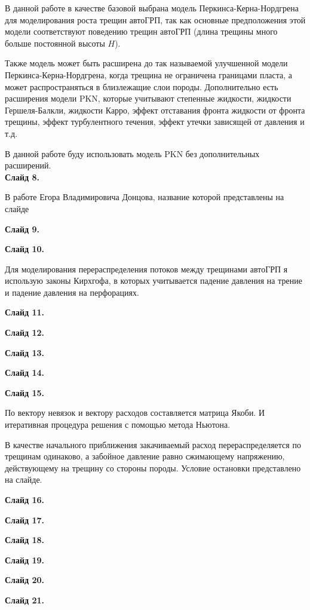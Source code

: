 \documentclass[a4paper, 12pt]{article}
\begin{document}
В данной работе в качестве базовой выбрана модель Перкинса-Керна-Нордгрена для моделирования роста трещин автоГРП, так как основные предположения этой модели соответствуют поведению трещин автоГРП (длина трещины много больше постоянной высоты $H$).


Также модель может быть расширена до так называемой улучшенной модели Перкинса-Керна-Нордгрена, когда трещина не ограничена границами пласта, а может распространяться в близлежащие слои породы.
Дополнительно есть расширения модели PKN, которые учитывают степенные жидкости, жидкости Гершеля-Балкли, жидкости Карро, эффект отставания фронта жидкости от фронта трещины, эффект турбулентного течения, эффект утечки зависящей от давления и т.д.

В данной работе буду использовать модель PKN без дополнительных расширений.
\\


\textbf{Слайд 8.}

В работе Егора Владимировича Донцова, название которой представлены на слайде 

\textbf{Слайд 9.}

\textbf{Слайд 10.}

Для моделирования перераспределения потоков между трещинами автоГРП я использую законы Кирхгофа, в которых учитывается падение давления на трение и падение давления на перфорациях.

\textbf{Слайд 11.}

\textbf{Слайд 12.}

\textbf{Слайд 13.}

\textbf{Слайд 14.}

\textbf{Слайд 15.}

По вектору невязок и вектору расходов составляется матрица Якоби.
И итеративная процедура решения с помощью метода Ньютона.

В качестве начального приближения закачиваемый расход перераспределяется по трещинам одинаково, а забойное давление равно сжимающему напряжению, действующему на трещину со стороны породы.
Условие остановки представлено на слайде.


\textbf{Слайд 16.}

\textbf{Слайд 17.}

\textbf{Слайд 18.}

\textbf{Слайд 19.}

\textbf{Слайд 20.}

\textbf{Слайд 21.}
\end{document}
